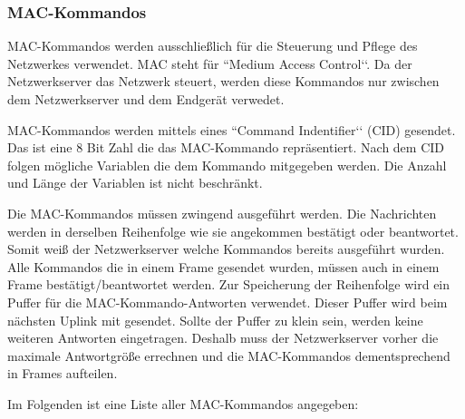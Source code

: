 \documentclass[a4paper, 12pt]{article}
\begin{document}
            \subsubsection{MAC-Kommandos}
                MAC-Kommandos werden ausschließlich für die Steuerung und Pflege des Netzwerkes verwendet. MAC steht 
                für ``Medium Access Control‘‘. Da der Netzwerkserver das Netzwerk steuert, werden diese Kommandos nur 
                zwischen dem Netzwerkserver und dem Endgerät verwedet.

                MAC-Kommandos werden mittels eines ``Command Indentifier‘‘ (CID) gesendet. Das ist eine 8 Bit Zahl die 
                das MAC-Kommando repräsentiert. Nach dem CID folgen mögliche Variablen die dem Kommando mitgegeben 
                werden. Die Anzahl und Länge der Variablen ist nicht beschränkt.
                
                Die MAC-Kommandos müssen zwingend ausgeführt werden. Die Nachrichten werden in derselben Reihenfolge 
                wie sie angekommen bestätigt oder beantwortet. Somit weiß der Netzwerkserver welche Kommandos 
                bereits ausgeführt wurden. Alle Kommandos die in einem Frame gesendet wurden, müssen auch in einem Frame  
                bestätigt/beantwortet werden. Zur Speicherung der Reihenfolge wird ein Puffer für die 
                MAC-Kommando-Antworten verwendet. Dieser Puffer wird beim nächsten Uplink mit gesendet. 
                Sollte der Puffer zu klein sein, werden keine weiteren Antworten eingetragen. 
                Deshalb muss der Netzwerkserver vorher die maximale Antwortgröße errechnen und die 
                MAC-Kommandos dementsprechend in Frames aufteilen.\cite[S.29 ff.]{LoRaSpec}

                Im Folgenden ist eine Liste aller MAC-Kommandos angegeben:
           
\end{document}
